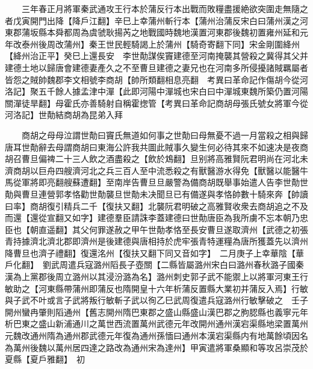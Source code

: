 　　三年春正月將軍秦武通攻王行本於蒲反行本出戰而敗糧盡援絶欲突圍走無隨之者戊寅開門出降【降戶江翻】辛巳上幸蒲州斬行本【蒲州治蒲反宋白曰蒲州漢之河東郡蒲坂縣本舜都周為虞虢耿揚芮之地戰國時魏地漢置河東郡後魏初置雍州延和元年改泰州後周改蒲州】秦王世民輕騎謁上於蒲州【騎奇寄翻下同】宋金剛圍絳州【絳州治正平】癸巳上還長安　李世勣謀俟竇建德至河南掩襲其營殺之冀得其父并建德土地以歸唐會建德妻產久之不至曹旦建德之妻兄也在河南多所侵擾諸賊羈屬者皆怨之賊帥魏郡李文相號李商胡【帥所類翻相息亮翻　考異曰革命記作傷胡今從河洛記】聚五千餘人據孟津中潬【此即河陽中潬城也宋白曰中潬城東魏所築仍置河陽關潬徒旱翻】母霍氏亦善騎射自稱霍揔管【考異曰革命記商胡母張氏號女將軍今從河洛記】世勣結商胡為昆弟入拜

　　商胡之母母泣謂世勣曰竇氏無道如何事之世勣曰母無憂不過一月當殺之相與歸唐耳世勣辭去母謂商胡曰東海公許我共圖此賊事久變生何必待其來不如速决是夜商胡召曹旦偏禆二十三人飲之酒盡殺之【飲於鴆翻】旦别將高雅賢阮君明尚在河北未濟商胡以巨舟四艘濟河北之兵三百人至中流悉殺之有獸醫游水得免【獸醫以能醫牛馬從軍將即亮翻艘蘇遭翻】至南岸告曹旦旦嚴警為備商胡既舉事始遣人告李世勣世勣與曹旦連營郭孝恪勸世勣襲旦世勣未决聞旦已有備遂與孝恪帥數十騎來奔【帥讀曰率】商胡復引精兵二千【復扶又翻】北襲阮君明破之高雅賢收衆去商胡追之不及而還【還從宣翻又如字】建德羣臣請誅李蓋建德曰世勣唐臣為我所虜不忘本朝乃忠臣也【朝直遥翻】其父何罪遂赦之甲午世勣孝恪至長安曹旦遂取濟州【武德之初張青持據濟北濟北郡即濟州是後建德與唐相持於虎牢張青特運糧為唐所獲蓋先以濟州降曹旦也濟子禮翻】復還洺州【復扶又翻下同又音如字】　二月庚子上幸華陰【華戶化翻】　劉武周遣兵寇潞州䧟長子壺關【二縣皆屬潞州宋白曰潞州春秋潞子國秦漢為上黨郡後周立潞州以其浸汾潞為名】潞州刺史郭子武不能禦上以將軍河東王行敏助之【河東縣帶蒲州即蒲反也隋開皇十六年析蒲反置縣大業初并蒲反入焉】行敏與子武不叶或言子武將叛行敏斬子武以徇乙巳武周復遣兵寇潞州行敏擊破之　壬子開州蠻冉肇則䧟通州【舊志開州隋巴東郡之盛山縣盛山漢巴郡之朐䏰縣也義寧元年析巴東之盛山新浦通川之萬世西流置萬州武德元年改開州通州漢宕渠縣地梁置萬州元魏改通州隋為通州郡武德元年復為通州孫愐曰通州本漢宕渠縣内有地萬餘頃因名為萬州後魏以萬州居四達之路改為通州宋為達州】甲寅遣將軍桑顯和等攻呂崇茂於夏縣【夏戶雅翻】　初

